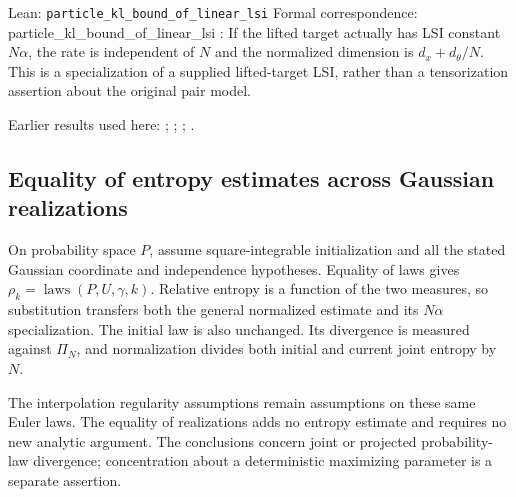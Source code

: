 \documentclass[11pt,a4paper]{report}
\begin{document}
\begin{leanbox}{Lean: \texttt{particle\_\allowbreak{}kl\_\allowbreak{}bound\_\allowbreak{}of\_\allowbreak{}linear\_\allowbreak{}lsi}}
Formal correspondence: particle\_kl\_bound\_of\_linear\_lsi : If the lifted target actually has LSI constant \(N\alpha\), the rate is independent of \(N\) and the normalized dimension is \(d_x+d_\theta/N\). This is a specialization of a supplied lifted-target LSI, rather than a tensorization assertion about the original pair model.
\end{leanbox}


Earlier results used here: \cite[Section~3.1.3]{LangevinLean2026ULALSI}; \cite[Section~3.34.1]{LangevinLean2026ULALSI}; \cite[Section~3.1.1]{LangevinLean2026IPLA}; \cite[Section~3.3.2]{LangevinLean2026IPLA}.
\subsection{\texorpdfstring{Equality of entropy estimates across Gaussian realizations}{Equality of entropy estimates across Gaussian realizations}}
\label{report-step-IPLA-LSI-Theorem-lean-6}


On probability space \(P\), assume square-integrable initialization and all the stated Gaussian coordinate and independence hypotheses. Equality of laws gives \(\rho_k=\operatorname{laws}(P,U,\gamma,k)\). Relative entropy is a function of the two measures, so substitution transfers both the general normalized estimate and its \(N\alpha\) specialization. The initial law is also unchanged. Its divergence is measured against \(\Pi_N\), and normalization divides both initial and current joint entropy by \(N\).



The interpolation regularity assumptions remain assumptions on these same Euler laws. The equality of realizations adds no entropy estimate and requires no new analytic argument. The conclusions concern joint or projected probability-law divergence; concentration about a deterministic maximizing parameter is a separate assertion.
\end{document}
